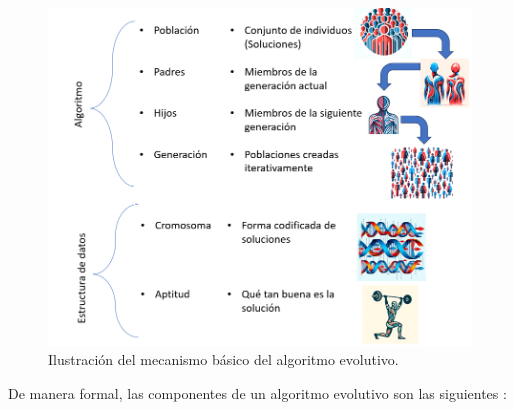 \begin{figure}[H]
    \centering
    \includegraphics[width=\textwidth]{Figuras/AE_parts_algorithm.png}
    \caption{Ilustración del mecanismo básico del algoritmo evolutivo. }
    \label{fig:EA_mech}
\end{figure}

De manera formal, las componentes de un algoritmo evolutivo son las siguientes \cite{coelloEvolutionaryAlgorithmsSolving}:


